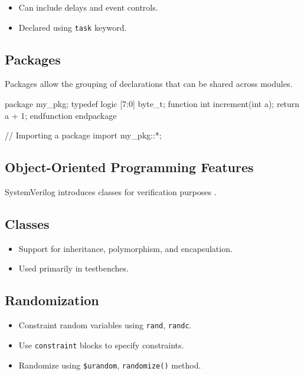 \begin{itemize}
    \item Can include delays and event controls.
    \item Declared using \texttt{task} keyword.
\end{itemize}

\subsection{Packages}
Packages allow the grouping of declarations that can be shared across modules.
\begin{verilogcode}
package my_pkg;
    typedef logic [7:0] byte_t;
    function int increment(int a);
        return a + 1;
    endfunction
endpackage

// Importing a package
import my_pkg::*;
\end{verilogcode}

\subsection{Object-Oriented Programming Features}
SystemVerilog introduces classes for verification purposes \cite{stapko2008advanced}.

\subsection{Classes}
\begin{itemize}
    \item Support for inheritance, polymorphism, and encapsulation.
    \item Used primarily in testbenches.
\end{itemize}

\subsection{Randomization}
\begin{itemize}
    \item Constraint random variables using \texttt{rand}, \texttt{randc}.
    \item Use \texttt{constraint} blocks to specify constraints.
    \item Randomize using \texttt{\$urandom}, \texttt{randomize()} method.
\end{itemize}

